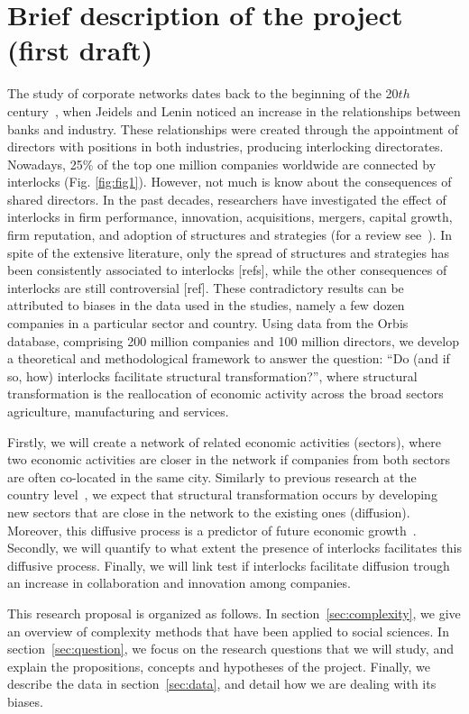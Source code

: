 \section{Brief description of the project (first draft)}
\label{sec:description}
The study of corporate networks dates back to the beginning of the 20$th$ century~\citep{jeidels1905,Lenin1917},
when Jeidels and Lenin noticed an increase in the relationships between banks and industry. 
These relationships were created through the appointment of directors with positions in both industries,
producing interlocking directorates.
Nowadays, 25\% of the top one million companies worldwide are connected by interlocks (Fig. \ref{fig:fig1}).
However, not much is know about the consequences of shared directors.
In the past decades, researchers have investigated the effect of interlocks in firm performance, innovation, acquisitions, mergers, capital growth, firm reputation, and adoption of structures and strategies (for a review see~\cite{Mizruchi1996}).
In spite of the extensive literature,  
only the spread of structures and strategies has been consistently associated to interlocks [refs],
while the other consequences of interlocks are still controversial [ref].
These contradictory results can be attributed to biases in the data used in the studies,
namely a few dozen companies in a particular sector and country.
Using data from the Orbis database, 
comprising 200 million companies and 100 million directors, 
we develop a theoretical and methodological framework to answer the question:
``Do (and if so, how) interlocks facilitate structural transformation?'',
where structural transformation is the reallocation of economic activity across the broad sectors agriculture, manufacturing and services.

Firstly, we will create a network of related economic activities (sectors),
where two economic activities are closer in the network if companies from both sectors are often co-located in the same city.
Similarly to previous research at the country level~\cite{hidalgo2007, hausmann2011, Hausmann2006,hidalgo2009}, 
we expect that structural transformation occurs by developing new sectors that are close in the network to the existing ones (diffusion).
Moreover, this diffusive process is a predictor of future economic growth~\cite{hidalgo2009}.
Secondly, we will quantify to what extent the presence of interlocks facilitates this diffusive process.
Finally, we will link test if interlocks facilitate diffusion trough an increase in collaboration and innovation among companies.


This research proposal is organized as follows. 
In section~\ref{sec:complexity}, we give an overview of complexity methods that have been applied to social sciences.
In section~\ref{sec:question}, we focus on the research questions that we will study,
and explain the propositions, concepts and hypotheses of the project.
Finally, we describe the data in section~\ref{sec:data}, and detail how we are dealing with its biases.



